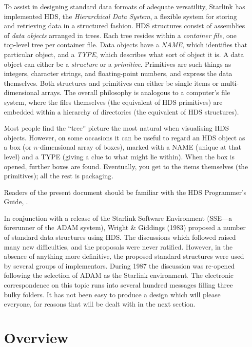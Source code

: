 To assist in designing standard data formats of adequate
versatility, Starlink has implemented HDS, the
{\it Hierarchical Data System},
a flexible system for storing and retrieving data in a
structured fashion.
HDS structures consist of assemblies of
{\it data objects}
arranged in trees.  Each tree resides within a
{\it container file},
one top-level tree per container file.
Data objects have a
{\it NAME},
which identifies that particular object, and a
{\it TYPE},
which describes what sort of object it is.
A data object can either be a
{\it structure}
or a
{\it primitive}.
Primitives are such things as integers,
character strings, and floating-point numbers, and express the
data themselves.  Both structures and primitives can
either be single items or multi-dimensional arrays.  The overall
philosophy is analogous to a computer's file system, where
the files themselves (the equivalent of HDS primitives)
are embedded within a hierarchy of directories (the equivalent
of HDS structures).

Most people find the ``tree'' picture the most natural when
visualising HDS objects.  However, on some occasions it can
be useful to regard an HDS object as a box (or $n$-dimensional
array of boxes), marked with a NAME (unique at that level)
and a TYPE (giving a clue to what might lie within).  When
the box is opened, further boxes are found.  Eventually,
you get to the items themselves (the primitives);  all the
rest is packaging.

Readers of the present document
should be familiar with the HDS Programmer's Guide, .

In conjunction with a release of
the Starlink Software Environment ({\small SSE}---a forerunner of the
{\small ADAM} system),
Wright \& Giddings (1983) proposed a number of standard data structures
using HDS.  The discussions which followed raised many
new difficulties, and the proposals were never
ratified.  However, in the absence of anything more definitive,
the proposed standard structures were used by several
groups of implementors.  During 1987 the discussion was re-opened
following the selection of {\small ADAM} as the Starlink environment.  The
electronic correspondence on this topic runs into several hundred
messages filling three bulky
folders.  It has not been easy to produce a design which
will please everyone, for reasons that will be dealt with
in the next section.

\section{Overview\label{se:overview}}

